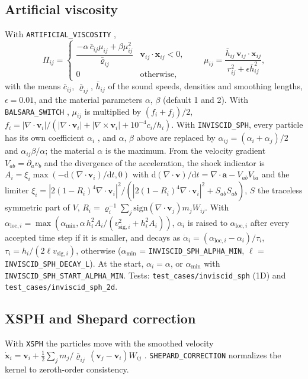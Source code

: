 \documentclass[10pt,fleqn,twoside]{article}
\renewcommand{\vec}[1]{{\mathbf #1}}
\newcommand{\sw}[1]{\texttt{#1}}
\begin{document}
\subsection{Artificial viscosity}
With \sw{ARTIFICIAL\_VISCOSITY} \citep{Monaghan85a},
\begin{equation}
 \Pi_{ij} = \begin{cases} \dfrac{-\alpha\,\bar c_{ij}\mu_{ij} + \beta\mu_{ij}^2}{\bar\varrho_{ij}} &
  \vec v_{ij}\cdot\vec x_{ij} < 0,\\[1.5ex] 0 & \text{otherwise,}\end{cases}
 \qquad \mu_{ij} = \frac{\bar h_{ij}\,\vec v_{ij}\cdot\vec x_{ij}}{r_{ij}^2 + \epsilon\bar h_{ij}^2},
\end{equation}
with the means $\bar c_{ij}$, $\bar\varrho_{ij}$, $\bar h_{ij}$ of the sound speeds, densities and smoothing lengths,
$\epsilon = 0.01$, and the material parameters $\alpha$, $\beta$ (default 1 and 2). With \sw{BALSARA\_SWITCH}
\citep{balsara1995}, $\mu_{ij}$ is multiplied by $(f_i+f_j)/2$,
$f_i = |\nabla\cdot\vec v_i|/(|\nabla\cdot\vec v_i| + |\nabla\times\vec v_i| + 10^{-4}c_i/h_i)$.
With \sw{INVISCID\_SPH}, every particle has its own coefficient $\alpha_i$ \citep{cullen2010}, and $\alpha$, $\beta$
above are replaced by $\alpha_{ij} = (\alpha_i+\alpha_j)/2$ and $\alpha_{ij}\beta/\alpha$; the material $\alpha$ is
the maximum. From the velocity gradient $V_{ab} = \partial_a v_b$ and the divergence of the acceleration, the shock
indicator is $A_i = \xi_i \max(-\mathrm{d}(\nabla\cdot\vec v_i)/\mathrm{d}t, 0)$ with $\mathrm{d}(\nabla\cdot\vec
v)/\mathrm{d}t = \nabla\cdot\vec a - V_{ab}V_{ba}$ and the limiter $\xi_i = |2(1-R_i)^4\nabla\cdot\vec v_i|^2 /
(|2(1-R_i)^4 \nabla\cdot\vec v_i|^2 + S_{ab}S_{ab})$, $S$ the traceless symmetric part of $V$, $R_i =
\varrho_i^{-1}\sum_j \mathrm{sign}(\nabla\cdot\vec v_j) m_j W_{ij}$. With $\alpha_{\mathrm{loc},i} =
\max(\alpha_{\min}, \alpha\, h_i^2A_i/(v_{\mathrm{sig},i}^2 + h_i^2A_i))$, $\alpha_i$ is raised to
$\alpha_{\mathrm{loc},i}$ after every accepted time step if it is smaller, and decays as $\dot\alpha_i =
(\alpha_{\mathrm{loc},i}-\alpha_i)/\tau_i$, $\tau_i = h_i/(2\ell v_{\mathrm{sig},i})$, otherwise ($\alpha_{\min}$ =
\sw{INVISCID\_SPH\_ALPHA\_MIN}, $\ell$ = \sw{INVISCID\_SPH\_DECAY\_L}). At the start, $\alpha_i = \alpha$, or
$\alpha_{\min}$ with \sw{INVISCID\_SPH\_START\_ALPHA\_MIN}. Tests: \texttt{test\_cases/inviscid\_sph} (1D) and
\texttt{test\_cases/inviscid\_sph\_2d}.

\subsection{XSPH and Shepard correction}
With \sw{XSPH} the particles move with the smoothed velocity $\dot{\vec x}_i = \vec v_i + \frac{1}{2}
\sum_j m_j/\bar\varrho_{ij}\,(\vec v_j - \vec v_i)W_{ij}$ \citep{monaghan:1989}. \sw{SHEPARD\_CORRECTION} normalizes
the kernel to zeroth-order consistency.
\end{document}
